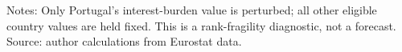 \begin{table}[H]
\centering
\caption{Portugal rank sensitivity to small burden changes, 2025}
\label{tab:europe-rank-sensitivity}
\smallskip
\small Notes: Only Portugal's interest-burden value is perturbed; all other eligible country values are held fixed. This is a rank-fragility diagnostic, not a forecast. Source: author calculations from Eurostat data.
\end{table}
